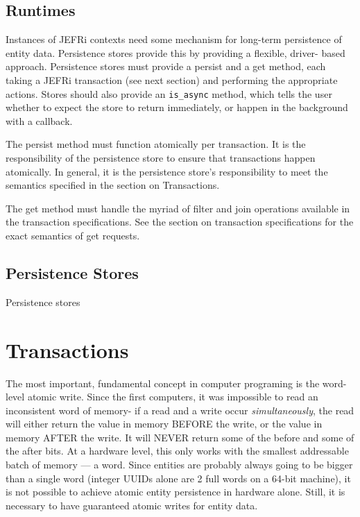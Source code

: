 \documentclass{article}
\newcommand{\ilcode}{\tt}
\begin{document}
\subsection{Runtimes}

Instances of JEFRi contexts need some mechanism for long-term persistence of
entity data. Persistence stores provide this by providing a flexible, driver-
based approach. Persistence stores must provide a persist and a get method, each
taking a JEFRi transaction (see next section) and performing the appropriate
actions. Stores should also provide an {\ilcode is\_async} method, which tells
the user whether to expect the store to return immediately, or happen in the
background with a callback.

The persist method must function atomically per transaction. It is the
responsibility of the persistence store to ensure that transactions happen
atomically. In general, it is the persistence store's responsibility to meet the
semantics specified in the section on Transactions.

The get method must handle the myriad of filter and join operations available in
the transaction specifications. See the section on transaction specifications
for the exact semantics of get requests.

\subsection{Persistence Stores}
Persistence stores

\section{Transactions}

The most important, fundamental concept in computer programing is the word-level
atomic write. Since the first computers, it was impossible to read an
inconsistent word of memory- if a read and a write occur {\sl simultaneously},
the read will either return the value in memory BEFORE the write, or the value
in memory AFTER the write. It will NEVER return some of the before and some of
the after bits. At a hardware level, this only works with the smallest
addressable batch of memory --- a word. Since entities are probably always going
to be bigger than a single word (integer UUIDs alone are 2 full words on a
64-bit machine), it is not possible to achieve atomic entity persistence in
hardware alone. Still, it is necessary to have guaranteed atomic writes for
entity data.
\end{document}
